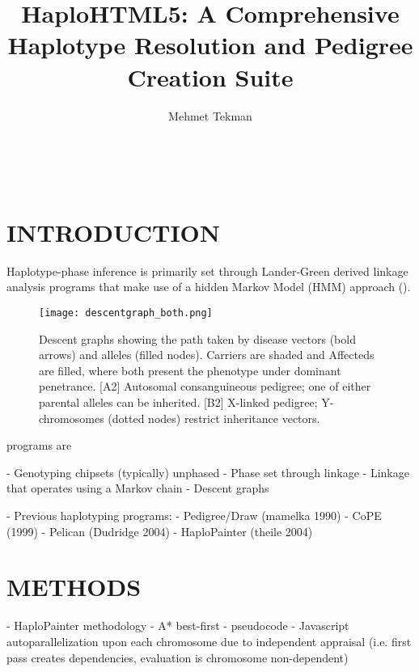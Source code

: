 \documentclass[12pt,a4paper,twocolumn]{article}
\author{Mehmet Tekman}
\title{HaploHTML5: A Comprehensive Haplotype Resolution and Pedigree Creation Suite}
\newcommand{\imgscale}{0.26}
\newcommand{\imgscale}{0.52}
\begin{document}
\fontsize{7pt}{9pt}
\selectfont\



\section{INTRODUCTION}

Haplotype-phase inference is primarily set through Lander-Green derived linkage analysis programs that make use of a hidden Markov Model (HMM) approach (\citet{landergreen,kruglyak_parametric_1996}).

\begin{figure}[h]
\centering
\texttt{[image: descentgraph\_both.png]}
\caption{Descent graphs showing the path taken by disease vectors (bold arrows) and alleles (filled nodes). Carriers are shaded and Affecteds are filled, where both present the phenotype under dominant penetrance. [A2] Autosomal consanguineous pedigree; one of either parental alleles can be inherited. [B2] X-linked pedigree; Y-chromosomes (dotted nodes) restrict inheritance vectors.}
\end{figure}




programs are 

 - Genotyping chipsets (typically) unphased
 - Phase set through linkage
 - Linkage that operates using a Markov chain
 - Descent graphs

 - Previous haplotyping programs:
 	  - Pedigree/Draw (mamelka 1990)
 	  - CoPE (1999)
 	  - Pelican (Dudridge 2004)
 	  - HaploPainter (theile 2004)
 

\section{METHODS}
 - HaploPainter methodology
 - A* best-first
     - pseudocode
 - Javascript autoparallelization upon each chromosome due to independent appraisal (i.e. first pass creates dependencies, evaluation is chromosome non-dependent)





\end{document}
